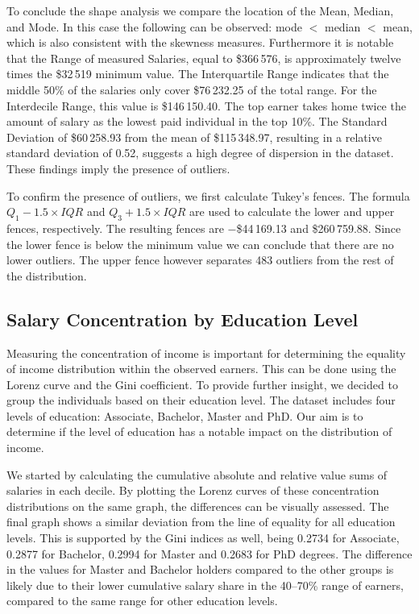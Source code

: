 \documentclass[12pt, a4paper, titlepage]{article}
\begin{document}
\par To conclude the shape analysis we compare the location of the Mean, Median, and Mode. In this case the following can be observed: mode $<$ median $<$ mean, which is also consistent with the skewness measures. Furthermore it is notable that the Range of measured Salaries, equal to \$366\,576, is approximately twelve times the \$32\,519 minimum value. The Interquartile Range indicates that the middle 50\% of the salaries only cover \$76\,232.25 of the total range. For the Interdecile Range, this value is \$146\,150.40. The top earner takes home twice the amount of salary as the lowest paid individual in the top 10\%. The Standard Deviation of \$60\,258.93 from the mean of \$115\,348.97, resulting in a relative standard deviation of 0.52,  suggests a high degree of dispersion in the dataset. These findings imply the presence of outliers.

To confirm the presence of outliers, we first calculate Tukey's fences. The formula $Q_1 - 1.5 \times IQR$ and $Q_3 + 1.5 \times IQR$ are used to calculate the lower and upper fences, respectively. The resulting fences are $-$\$44\,169.13 and \$260\,759.88. Since the lower fence is below the minimum value we can conclude that there are no lower outliers. The upper fence however separates 483 outliers from the rest of the distribution.

\subsection{Salary Concentration by Education Level}
Measuring the concentration of income is important for determining the equality of income distribution within the observed earners. This can be done using the Lorenz curve and the Gini coefficient. To provide further insight, we decided to group the individuals based on their education level. The dataset includes four levels of education: Associate, Bachelor, Master and PhD. Our aim is to determine if the level of education has a notable impact on the distribution of income.

We started by calculating the cumulative absolute and relative value sums of salaries in each decile. By plotting the Lorenz curves of these concentration distributions on the same graph, the differences can be visually assessed. The final graph shows a similar deviation from the line of equality for all education levels. This is supported by the Gini indices as well, being 0.2734 for Associate, 0.2877 for Bachelor, 0.2994 for Master and 0.2683 for PhD degrees. The difference in the values for Master and Bachelor holders compared to the other groups is likely due to their lower cumulative salary share in the 40--70\% range of earners, compared to the same range for other education levels.
\end{document}
